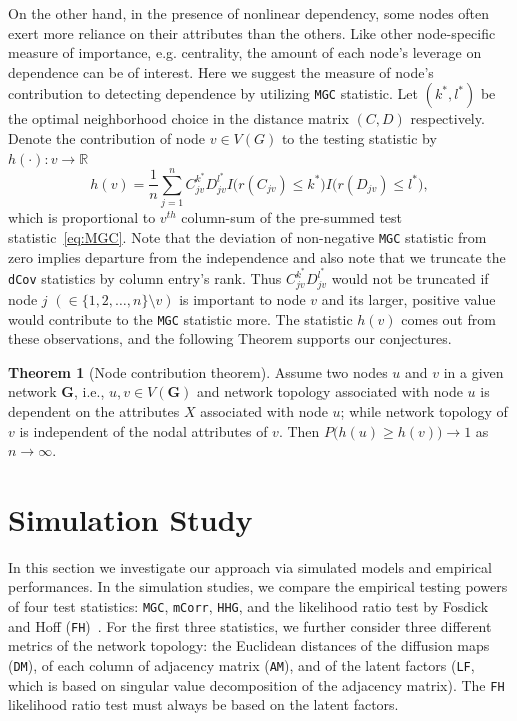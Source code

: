 \documentclass[11pt]{article}
\theoremstyle{definition}
\newtheorem{theorem}{Theorem}[section]
\begin{document}
On the other hand, in the presence of nonlinear dependency, some nodes often exert more reliance on their attributes than the others. Like other node-specific measure of importance, e.g. centrality,  the amount of each node's leverage on dependence can be of interest. Here we suggest the measure of node's contribution to detecting dependence by utilizing \texttt{MGC} statistic. Let $(k^{*}, l^{*})$ be the optimal neighborhood choice in the distance matrix $(C, D)$ respectively. Denote the contribution of node $v \in V(G)$ to the testing statistic by  $h(\cdot) : v \rightarrow \mathbb{R}$
\begin{equation}
\label{eq:contribution}
h(v) =  \frac{1}{n} \sum\limits_{j=1}^{n} C^{k^{*}}_{j v} D^{l^{*}}_{j v} I \big(  r (C_{j v}) \leq k^{*}  \big) I \big( r (D_{ j v }) \leq l^{*} \big), 
\end{equation}
which is proportional to $v^{th}$ column-sum of the pre-summed test statistic~\ref{eq:MGC}. Note that the deviation of non-negative \texttt{MGC} statistic from zero implies departure from the independence and also note that we truncate the \texttt{dCov} statistics by column entry's rank. Thus $C^{k^{*}}_{j v} D^{l^{*}}_{j v}$ would not be truncated if node $j$ $(\in \{ 1,2, \ldots, n \} \setminus v )$ is important to node $v$ and its larger, positive value would contribute to the \texttt{MGC} statistic more. The statistic $h(v)$ comes out from these observations, and the following Theorem supports our conjectures. 

\begin{theorem}[Node contribution theorem]
	\label{contributiontheorem}
	Assume two nodes $u$ and $v$ in a given network $\mathbf{G}$, i.e., $u, v \in V(\mathbf{G})$ and network topology associated with node $u$  is dependent on the attributes $X$ associated with node $u$; while network topology of $v$ is independent of the nodal attributes of $v$. Then $P\big(  h(u)  \geq h(v) \big) \longrightarrow 1$ as $n \rightarrow \infty$.
\end{theorem}	

\section{Simulation Study}
\label{sec:simulation}
	\vspace*{-0.2cm}
In this section we investigate our approach via simulated models and empirical performances. In the simulation studies, we compare the empirical testing powers of four test statistics: \texttt{MGC}, \texttt{mCorr}, \texttt{HHG}, and the likelihood ratio test by Fosdick and Hoff (\texttt{FH})~\cite{fosdick2015testing}. For the first three statistics, we further consider three different metrics of the network topology: the Euclidean distances of the diffusion maps (\texttt{DM}), of each column of adjacency matrix (\texttt{AM}), and of the latent factors (\texttt{LF}, which is based on singular value decomposition of the adjacency matrix). The \texttt{FH} likelihood ratio test must always be based on the latent factors.
\end{document}
